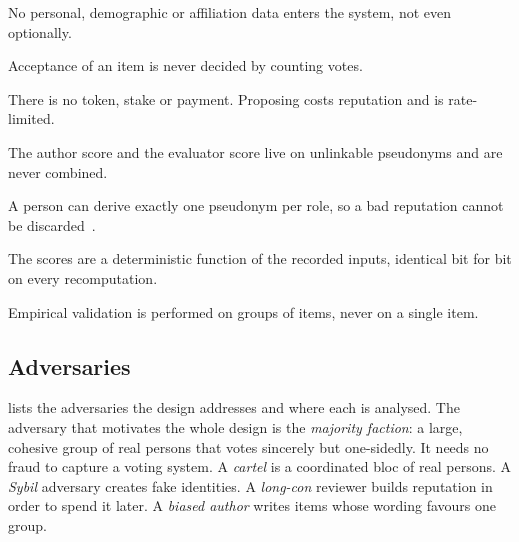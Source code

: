 \begin{requirement}[Anonymity]\label{req:anon}
No personal, demographic or affiliation data enters the system, not even optionally.
\end{requirement}
\begin{requirement}\label{req:nomajority}
Acceptance of an item is never decided by counting votes.
\end{requirement}
\begin{requirement}[No money]\label{req:nomoney}
There is no token, stake or payment. Proposing costs reputation and is rate-limited.
\end{requirement}
\begin{requirement}\label{req:separate}
The author score and the evaluator score live on unlinkable pseudonyms and are never combined.
\end{requirement}
\begin{requirement}\label{req:norotate}
A person can derive exactly one pseudonym per role, so a bad reputation cannot be discarded~\cite{friedman2001pseudonyms}.
\end{requirement}
\begin{requirement}[Reproducibility]\label{req:repro}
The scores are a deterministic function of the recorded inputs, identical bit for bit on every
recomputation.
\end{requirement}
\begin{requirement}\label{req:batch}
Empirical validation is performed on groups of items, never on a single item.
\end{requirement}

\subsection{Adversaries}

 lists the adversaries the design addresses and where each is analysed.
The adversary that motivates the whole design is the \emph{majority faction}: a large, cohesive
group of real persons that votes sincerely but one-sidedly. It needs no fraud to capture a
voting system. A \emph{cartel} is a coordinated bloc of real persons. A \emph{Sybil}
adversary creates fake identities. A \emph{long-con} reviewer builds reputation in order to spend
it later. A \emph{biased author} writes items whose wording favours one group.

